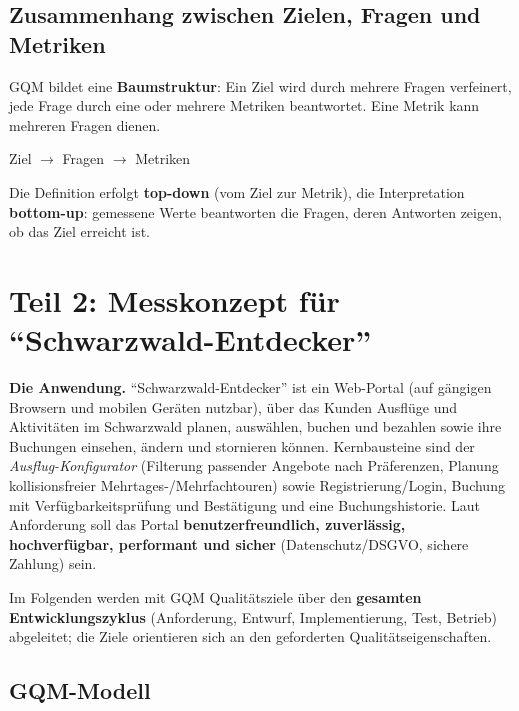 \documentclass[
	fontsize=12pt,          %
	paper=a4,               %
	numbers=noenddot,       %
	listof=totoc,           %
	listof=entryprefix,     %
	listof=nochaptergap,    %
	bibliography=totoc,     %
	parskip=half,           %
	openany                 %
]{scrbook}
\begin{document}
\subsection*{Zusammenhang zwischen Zielen, Fragen und Metriken}

GQM bildet eine \textbf{Baumstruktur}: Ein Ziel wird durch mehrere Fragen
verfeinert, jede Frage durch eine oder mehrere Metriken beantwortet. Eine Metrik
kann mehreren Fragen dienen.

\begin{center}
	Ziel \;$\rightarrow$\; Fragen \;$\rightarrow$\; Metriken
\end{center}

Die Definition erfolgt \textbf{top-down} (vom Ziel zur Metrik), die
Interpretation \textbf{bottom-up}: gemessene Werte beantworten die Fragen, deren
Antworten zeigen, ob das Ziel erreicht ist.



\section*{Teil 2: Messkonzept für ``Schwarzwald-Entdecker''}

\textbf{Die Anwendung.} ``Schwarzwald-Entdecker'' ist ein Web-Portal (auf
gängigen Browsern und mobilen Geräten nutzbar), über das Kunden Ausflüge und
Aktivitäten im Schwarzwald planen, auswählen, buchen und bezahlen sowie ihre
Buchungen einsehen, ändern und stornieren können. Kernbausteine sind der
\emph{Ausflug-Konfigurator} (Filterung passender Angebote nach Präferenzen,
Planung kollisionsfreier Mehrtages-/Mehrfachtouren) sowie Registrierung/Login,
Buchung mit Verfügbarkeitsprüfung und Bestätigung und eine Buchungshistorie.
Laut Anforderung soll das Portal \textbf{benutzerfreundlich, zuverlässig,
hochverfügbar, performant und sicher} (Datenschutz/DSGVO, sichere Zahlung) sein.

Im Folgenden werden mit GQM Qualitätsziele über den \textbf{gesamten
Entwicklungszyklus} (Anforderung, Entwurf, Implementierung, Test, Betrieb)
abgeleitet; die Ziele orientieren sich an den geforderten Qualitätseigenschaften.

\subsection*{GQM-Modell}
\end{document}

